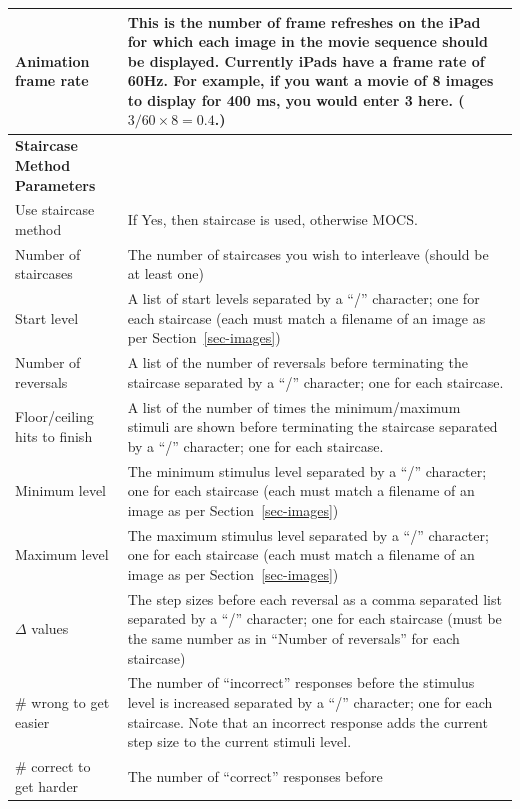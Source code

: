 \documentclass{article}
\begin{document}
\begin{longtable}{|p{5cm}|p{10cm}|}
\hline
Animation frame rate & This is the number of frame refreshes on the iPad
for which each image in the movie sequence should be displayed.
Currently iPads have a frame rate of 60Hz.
For example, if you want a movie of 8 images to display for 400 ms, you
would enter 3 here. ($3/60\times 8 = 0.4$.)
\\
\hline
\hline
{\bf Staircase Method Parameters}  & \\\nopagebreak
Use staircase method & If Yes, then staircase is used, otherwise MOCS. \\
\hline
Number of staircases & The number of
staircases you wish to interleave (should be at least one) \\
\hline
Start level & A list of start levels separated by a ``/'' character; one for each staircase
            (each must match a filename of an image as per Section~\ref{sec-images}) \\
\hline
Number of reversals & A list of the number of reversals before terminating the staircase 
            separated by a ``/'' character; one for each staircase. \\
\hline
Floor/ceiling hits to finish & A list of the number of times the minimum/maximum stimuli are shown
            before terminating the staircase 
            separated by a ``/'' character; one for each staircase. \\
\hline
Minimum level & The minimum stimulus level 
            separated by a ``/'' character; one for each staircase
            (each must match a filename of an image as per Section~\ref{sec-images}) \\
\hline
Maximum level & The maximum stimulus level 
            separated by a ``/'' character; one for each staircase
            (each must match a filename of an image as per Section~\ref{sec-images}) \\
\hline
$\Delta$ values & The step sizes before each reversal as a comma separated list
            separated by a ``/'' character; one for each staircase
            (must be the same number as in ``Number of reversals'' for each staircase)\\
\hline
\# wrong to get easier & The number of ``incorrect'' responses before 
            the stimulus level is increased
            separated by a ``/'' character; one for each staircase. 
            Note
            that an incorrect response adds the current step size to the 
            current stimuli level.\\
\hline
\# correct to get harder & The number of ``correct'' responses before 

\end{longtable}
\end{document}
